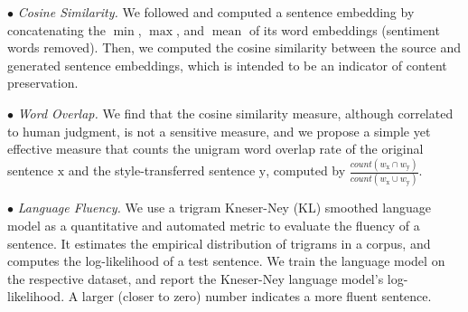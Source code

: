 \documentclass[letterpaper]{article} %
\begin{document}
$\bullet$ \textit{Cosine Similarity.}
We followed \citet{fu2018style} and computed a sentence embedding by concatenating the $\operatorname{min}$, $\operatorname{max}$, and $\operatorname{mean}$ of its word embeddings (sentiment words removed).
Then, we computed the cosine similarity between the source and generated sentence embeddings, which is intended to be an indicator of content preservation.

$\bullet$ \textit{Word Overlap.} We find that the cosine similarity measure, although correlated to human judgment, is not a sensitive measure, and we propose a simple yet effective measure that counts the unigram word overlap rate of the original sentence $\mathrm x$ and the style-transferred sentence $\mathrm y$, computed by $\frac{count(w_{\mathrm x} \cap w_{\mathrm y})}{count(w_{\mathrm x} \cup w_{\mathrm y})}$.

$\bullet$ \textit{Language Fluency.}
We use a trigram Kneser-Ney (KL) smoothed language model \cite{kneser1995improved} as a quantitative and automated metric to evaluate the fluency of a sentence.
It estimates the empirical distribution of trigrams in a corpus, and computes the log-likelihood of a test sentence.
We train the language model on the respective dataset, and report the Kneser-Ney language model's log-likelihood. A larger (closer to zero) number indicates a more fluent sentence.
\end{document}
